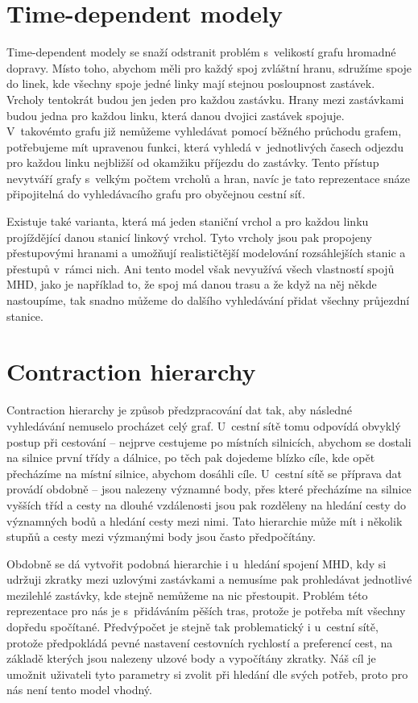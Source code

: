 \section{Time-dependent modely}
Time-dependent modely\cite{time-dependent} se snaží odstranit problém
s~velikostí grafu hromadné dopravy. Místo toho, abychom měli pro každý spoj
zvláštní hranu, sdružíme spoje do linek, kde všechny spoje jedné linky mají
stejnou posloupnost zastávek. Vrcholy tentokrát budou jen jeden pro každou
zastávku. Hrany mezi zastávkami budou jedna pro každou linku, která danou
dvojici zastávek spojuje. V~takovémto grafu již nemůžeme vyhledávat pomocí
běžného průchodu grafem, potřebujeme mít upravenou funkci, která vyhledá
v~jednotlivých časech odjezdu pro každou linku nejbližší od okamžiku příjezdu do
zastávky. Tento přístup nevytváří grafy s~velkým počtem vrcholů a hran, navíc je
tato reprezentace snáze připojitelná do vyhledávacího grafu pro obyčejnou cestní
síť.

Existuje také varianta, která má jeden staniční vrchol a
pro každou linku projíždějící danou stanicí linkový vrchol. Tyto vrcholy jsou
pak propojeny přestupovými hranami a umožňují realističtější modelování
rozsáhlejších stanic a přestupů v~rámci nich. Ani tento model však nevyužívá
všech vlastností spojů MHD, jako je například to, že spoj má danou trasu a že
když na něj někde nastoupíme, tak snadno můžeme do dalšího vyhledávání přidat všechny
průjezdní stanice.  

\section{Contraction hierarchy}
Contraction hierarchy\cite{CH} je způsob předzpracování dat tak, aby následné
vyhledávání nemuselo procházet celý graf. U~cestní sítě tomu odpovídá obvyklý
postup při cestování -- nejprve cestujeme po místních silnicích, abychom se
dostali na silnice první třídy a dálnice, po těch pak dojedeme blízko cíle, kde
opět přecházíme na místní silnice, abychom dosáhli cíle. U~cestní sítě se
příprava dat provádí obdobně -- jsou nalezeny významné body, přes které
přecházíme na silnice vyšších tříd a cesty na dlouhé vzdálenosti jsou pak
rozděleny na hledání cesty do významných bodů a hledání cesty mezi nimi. Tato
hierarchie může mít i několik stupňů a cesty mezi výzmanými body jsou často
předpočítány.

Obdobně se dá vytvořit podobná hierarchie i u~hledání spojení MHD, kdy si
udržuji zkratky mezi uzlovými zastávkami a nemusíme pak prohledávat jednotlivé
mezilehlé zastávky, kde stejně nemůžeme na nic přestoupit. Problém této
reprezentace pro nás je s~přidáváním pěších tras, protože je potřeba mít všechny dopředu
spočítané. Předvýpočet je stejně tak problematický i u~cestní sítě, protože
předpokládá pevné nastavení cestovních rychlostí a preferencí cest, na základě
kterých jsou nalezeny ulzové body a vypočítány zkratky. Náš cíl je umožnit
uživateli tyto parametry si zvolit při hledání dle svých potřeb, proto pro nás
není tento model vhodný. 

